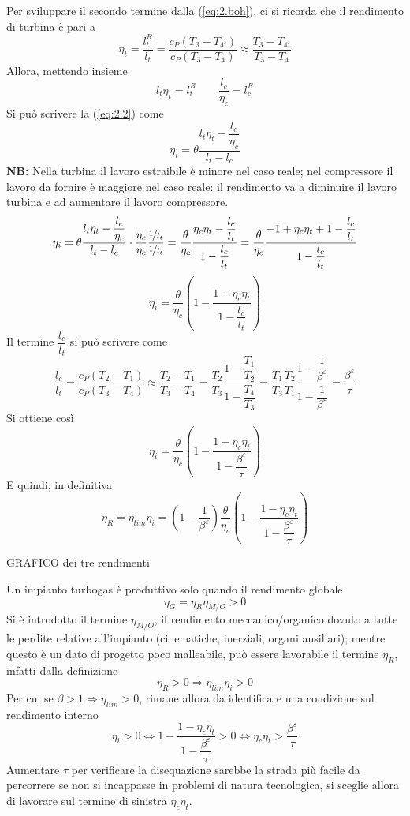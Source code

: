 \begin{adjustwidth}{2in}{}
	Per sviluppare il secondo termine dalla (\ref{eq:2.boh}), ci si ricorda che il rendimento di turbina è pari a
	\[\eta_t = \dfrac{l_t^R}{l_t} = \dfrac{c_P(T_3-T_{4'})}{c_P(T_3-T_4)} \approx \dfrac{T_3-T_{4'}}{T_3-T_4}\]
	Allora, mettendo insieme 
	\[l_t\eta_t = l_t^R \qquad \dfrac{l_c}{\eta_c} = l_c^R\]
	Si può scrivere la (\ref{eq:2.2}) come 
	\[\eta_i = \theta \dfrac{l_t\eta_t - \dfrac{l_c}{\eta_c}}{l_t-l_c}\]
	\textbf{NB:} Nella turbina il lavoro estraibile è minore nel caso reale; nel compressore il lavoro da fornire è maggiore nel caso reale: il rendimento va a diminuire il lavoro turbina e ad aumentare il lavoro compressore. 
	\[\eta_i = \theta \dfrac{l_t\eta_t - \dfrac{l_c}{\eta_c}}{l_t-l_c}\cdot	\dfrac{\eta_c}{\eta_c}\dfrac{\nicefrac{1}{l_t}}{\nicefrac{1}{l_t}} = \dfrac{\theta}{\eta_c} \dfrac{\eta_c\eta_t - \dfrac{l_c}{l_t}}{1-\dfrac{l_c}{l_t}} = \dfrac{\theta}{\eta_c} \dfrac{-1+\eta_c\eta_t +1 - \dfrac{l_c}{l_t}}{1-\dfrac{l_c}{l_t}}\]
	\[\eta_i = \dfrac{\theta}{\eta_c} \left(1-\dfrac{1-\eta_c\eta_t}{1-\dfrac{l_c}{l_t}}\right)\]
	Il termine $\dfrac{l_c}{l_t}$ si può scrivere come 
	\[\dfrac{l_c}{l_t} = \dfrac{c_P(T_2-T_1)}{c_P(T_3-T_4)}\approx \dfrac{T_2-T_1}{T_3-T_4} = \dfrac{T_2}{T_3}\dfrac{1-\dfrac{T_1}{T_2}}{1-\dfrac{T_4}{T_3}} = \dfrac{T_1}{T_3}\dfrac{T_2}{T_1}\dfrac{1-\dfrac{1}{\beta^\varepsilon}}{1-\dfrac{1}{\beta^\varepsilon}}= \dfrac{\beta^\varepsilon}{\tau}\]
	Si ottiene così
	\begin{equation}\label{eq:2.3}
		\boxed{\eta_i = \dfrac{\theta}{\eta_c} \left(1-\dfrac{1-\eta_c\eta_t}{1-\dfrac{\beta^\varepsilon}{\tau}}\right)} 
	\end{equation}
	E quindi, in definitiva 
	\begin{equation} \label{eq:2.4}
		\boxed{\eta_R = \eta_{lim}\eta_i = \left(1-\dfrac{1}{\beta^\varepsilon}\right) \dfrac{\theta}{\eta_c} \left(1-\dfrac{1-\eta_c\eta_t}{1-\dfrac{\beta^\varepsilon}{\tau}}\right)}
	\end{equation} 
	
	GRAFICO dei tre rendimenti
	
	Un impianto turbogas è produttivo solo quando il rendimento globale 
	\[\eta_G = \eta_R\eta_{M/O}>0\]
	Si è introdotto il termine $\eta_{M/O}$, il rendimento meccanico/organico dovuto a tutte le perdite relative all'impianto (cinematiche, inerziali, organi ausiliari); mentre questo è un dato di progetto poco malleabile, può essere lavorabile il termine $\eta_R$, infatti dalla definizione 
	\[\eta_R >0 \Rightarrow \eta_{lim}\eta_i>0\]
	Per cui se $\beta>1\Rightarrow\eta_{lim}>0$, rimane allora da identificare una condizione sul rendimento interno
	\[\eta_i>0\Leftrightarrow1-\dfrac{1-\eta_c\eta_t}{1-\dfrac{\beta^\varepsilon}{\tau}}>0 \Leftrightarrow \eta_c\eta_t>\dfrac{\beta^\varepsilon}{\tau}\]
	Aumentare $\tau$ per verificare la disequazione sarebbe la strada più facile da percorrere se non si incappasse in problemi di natura tecnologica, si sceglie allora di lavorare sul termine di sinistra $\eta_c\eta_t$.
	

\end{adjustwidth}
